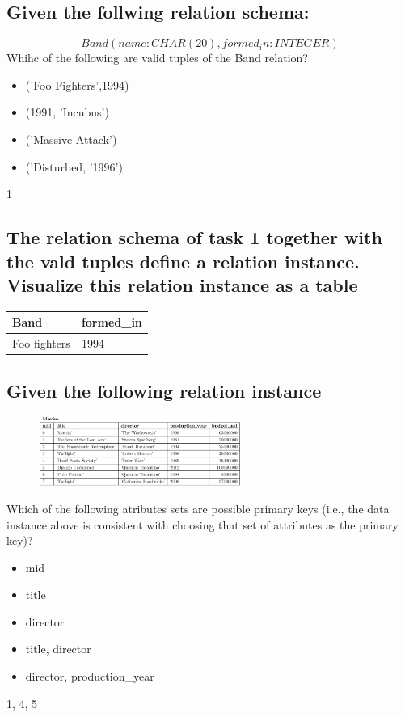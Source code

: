 \documentclass[12pt, a4paper]{article}
\begin{document}
		\subsection{Given the follwing relation schema:}
			$$Band(name: CHAR(20), formed_in: INTEGER)$$
			Whihc of the following are valid tuples of the Band relation?\\
			\begin{itemize}
				\item ('Foo Fighters',1994)
				\item (1991, 'Incubus')
				\item ('Massive Attack')
				\item ('Disturbed, '1996')
			\end{itemize}
			1\\
		\clearpage
		\subsection{The relation schema of task 1 together with the vald tuples define a relation instance. Visualize this relation instance as a table}
			\begin{table}[]
				\begin{tabular}{|l|l|}
				\hline
				Band         & formed\_in \\ \hline
				Foo fighters & 1994       \\ \hline
				\end{tabular}
			\end{table}
		\subsection{Given the following relation instance}
			\begin{figure}[h!]
				\centering
				\includegraphics[width=250px]{images/47,2.png}
				\label{}
				\caption{}
			\end{figure}
			Which of the following atributes sets are possible primary keys (i.e., the data instance above is consistent with choosing that set of attributes as the primary key)?
			\begin{itemize}
				\item {mid}
				\item {title}
				\item {director}
				\item {title, director}
				\item {director, production\_year}
			\end{itemize}
			1, 4, 5
\end{document}
